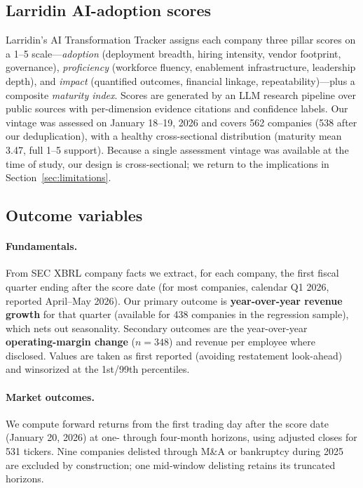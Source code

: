 \documentclass[11pt]{article}
\begin{document}
\subsection{Larridin AI-adoption scores}

Larridin's AI Transformation Tracker assigns each company three pillar scores
on a 1--5 scale---\emph{adoption} (deployment breadth, hiring intensity, vendor
footprint, governance), \emph{proficiency} (workforce fluency, enablement
infrastructure, leadership depth), and \emph{impact} (quantified outcomes,
financial linkage, repeatability)---plus a composite \emph{maturity index}.
Scores are generated by an LLM research pipeline over public sources with
per-dimension evidence citations and confidence labels. Our vintage was
assessed on January 18--19, 2026 and covers 562 companies (538 after our
deduplication), with a healthy cross-sectional distribution (maturity mean
3.47, full 1--5 support). Because a single assessment vintage was available at
the time of study, our design is cross-sectional; we return to the implications
in Section~\ref{sec:limitations}.

\subsection{Outcome variables}

\paragraph{Fundamentals.} From SEC XBRL company facts we extract, for each
company, the first fiscal quarter ending after the score date (for most
companies, calendar Q1 2026, reported April--May 2026). Our primary outcome is
\textbf{year-over-year revenue growth} for that quarter (available for 438
companies in the regression sample), which nets out seasonality. Secondary
outcomes are the year-over-year \textbf{operating-margin change} ($n=348$) and
revenue per employee where disclosed. Values are taken as first reported
(avoiding restatement look-ahead) and winsorized at the 1st/99th percentiles.

\paragraph{Market outcomes.} We compute forward returns from the first trading
day after the score date (January 20, 2026) at one- through four-month
horizons, using adjusted closes for 531 tickers. Nine companies delisted through
M\&A or bankruptcy during 2025 are excluded by construction; one mid-window
delisting retains its truncated horizons.
\end{document}
